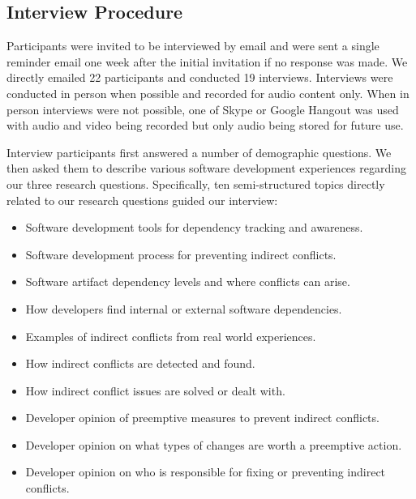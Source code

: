 \documentclass[conference]{IEEEtran}
\newcommand{\totalCategories}{10}
\begin{document}
\subsection{Interview Procedure}

Participants were invited to be interviewed by email and were sent a single reminder email one week
after the initial invitation if no response was made. We directly emailed 22 participants and  conducted
19 interviews. Interviews were conducted in person when possible and recorded for audio content only. When in person
interviews were not possible, one of Skype or Google Hangout was used with audio and video being recorded but only
audio being stored for future use. 


Interview participants first answered a number of  demographic questions. We then asked them to describe various software development experiences regarding our three research questions.
Specifically, ten semi-structured  topics directly related to our research questions guided our interview: 


\begin{itemize}

\item Software development tools for dependency tracking and awareness.

\item Software development process for preventing indirect conflicts.
\item Software artifact dependency levels and where conflicts can arise.

\item How developers find internal or external software dependencies.

\item Examples of indirect conflicts from real world experiences.
\item How indirect conflicts are detected and found.

\item How indirect conflict issues are solved or dealt with.
\item Developer opinion of preemptive measures to prevent indirect conflicts.

\item Developer opinion on what types of changes are worth a preemptive action.

\item Developer opinion on who is responsible for fixing or preventing indirect conflicts.
\end{itemize}
\end{document}
